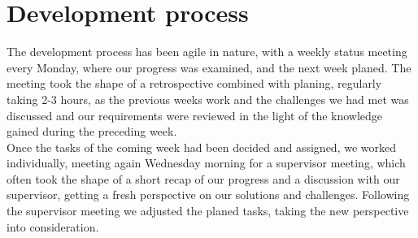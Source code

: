 \section{Development process}
The development process has been agile in nature, with a weekly status meeting every Monday, where our progress was examined, and the next week planed. The meeting took the shape of a retrospective combined with planing, regularly taking 2-3 hours, as the previous weeks work and the challenges we had met was discussed and our requirements were reviewed in the light of the knowledge gained during the preceding week.\\
Once the tasks of the coming week had been decided and assigned, we worked individually, meeting again Wednesday morning for a supervisor meeting, which often took the shape of a short recap of our progress and a discussion with our supervisor, getting a fresh perspective on our solutions and challenges. Following the supervisor meeting we adjusted the planed tasks, taking the new perspective into consideration.

